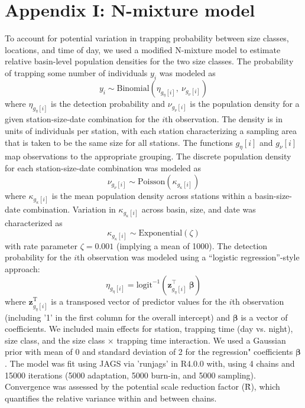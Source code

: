 \section*{Appendix I: N-mixture model} 

To account for potential variation in trapping probability between size classes,
locations, and time of day, 
we used a modified N-mixture model to estimate relative basin-level population densities
for the two size classes.
The probability of trapping some number of individuals $y_i$ 
was modeled as
%
\begin{equation}
  y_i \sim \text{Binomial}\left(\eta_{g_{\eta}[i]}, ~\nu_{g_{\nu}[i]}\right)
\end{equation}
%
where $\eta_{g_{\eta}[i]}$ is the detection probability 
and $\nu_{g_{\nu}[i]}$ is the population density for a given 
station-size-date combination for the $i$th observation.
The density is in units of individuals per station, 
with each station characterizing a sampling area that is 
taken to be the same size for all stations.
The functions ${g_{\eta}[i]}$ and ${g_{\nu}[i]}$ map observations to the 
appropriate grouping. 
The discrete population density for each station-size-date combination was modeled as
%
\begin{equation}
  \nu_{g_{\nu}[i]} \sim \text{Poisson}\left(\kappa_{g_{\kappa}[i]}\right)
\end{equation}
%
where $\kappa_{g_{\kappa}[i]}$ is the mean population density across stations 
within a basin-size-date combination. 
Variation in $\kappa_{g_{\kappa}[i]}$ across basin, size, 
and date was characterized as 
%
\begin{equation}
  \kappa_{g_{\kappa}[i]} \sim 
    \text{Exponential}\left(\zeta \right)
\end{equation}
%
with rate parameter $\zeta = 0.001$ (implying a mean of 1000).
The detection probability for the $i$th observation was modeled using a 
``logistic regression''-style approach:
%
\begin{equation}
  \eta_{g_{\eta}[i]} = 
    \text{logit}^{-1}\left(\mathbf{z}_{g_{\eta}[i]}^\top~{\boldsymbol\beta}\right)
\end{equation}
%
\noindent where $\mathbf{z}_{g_{\eta}[i]}^\text{T}$ is a transposed vector 
of predictor values for the $i$th observation
(including '1' in the first column for the overall intercept)
and $\boldsymbol\beta$ is a vector of coefficients. 
We included main effects for station, trapping time (day vs. night), size class,
and the size class $\times$ trapping time interaction.
We used a Gaussian prior with mean of 0 and standard deviation of 2 
for the regression" coefficients $\boldsymbol\beta$.
The model was fit using JAGS via 'runjags' in R4.0.0 with,
using 4 chains and 15000 iterations (5000 adaptation, 5000 burn-in, and 5000 sampling).
Convergence was assessed by the potential scale reduction factor (\^{R}),
which quantifies the relative variance within and between chains. 




